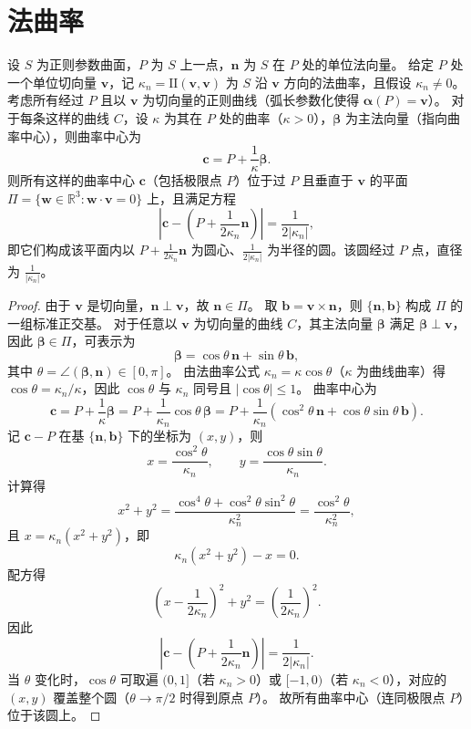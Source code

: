 \documentclass[../../main.tex]{subfiles}%
\begin{document}
\section{法曲率}

\begin{theorem}
设 $S$ 为正则参数曲面，$P$ 为 $S$ 上一点，$\boldsymbol{n}$ 为 $S$ 在 $P$ 处的单位法向量。
给定 $P$ 处一个单位切向量 $\boldsymbol{v}$，记 $\kappa_n = \mathrm{I\!I}(\boldsymbol{v},\boldsymbol{v})$ 为 $S$ 沿 $\boldsymbol{v}$ 方向的法曲率，且假设 $\kappa_n \neq 0$。
考虑所有经过 $P$ 且以 $\boldsymbol{v}$ 为切向量的正则曲线（弧长参数化使得 $\boldsymbol{\alpha}(P)=\boldsymbol{v}$）。
对于每条这样的曲线 $C$，设 $\kappa$ 为其在 $P$ 处的曲率（$\kappa>0$），$\boldsymbol{\beta}$ 为主法向量（指向曲率中心），则曲率中心为
\[
\boldsymbol{c} = P + \frac{1}{\kappa}\boldsymbol{\beta}.
\]
则所有这样的曲率中心 $\boldsymbol{c}$（包括极限点 $P$）位于过 $P$ 且垂直于 $\boldsymbol{v}$ 的平面 $\Pi = \{\boldsymbol{w}\in\mathbb{R}^3: \boldsymbol{w}\cdot\boldsymbol{v}=0\}$ 上，且满足方程
\[
\left|\boldsymbol{c} - \left(P + \frac{1}{2\kappa_n}\boldsymbol{n}\right)\right| = \frac{1}{2|\kappa_n|},
\]
即它们构成该平面内以 $P + \frac{1}{2\kappa_n}\boldsymbol{n}$ 为圆心、$\frac{1}{2|\kappa_n|}$ 为半径的圆。该圆经过 $P$ 点，直径为 $\frac{1}{|\kappa_n|}$。
\end{theorem}
\begin{proof}

由于 $\boldsymbol{v}$ 是切向量，$\boldsymbol{n}\perp\boldsymbol{v}$，故 $\boldsymbol{n}\in\Pi$。
取 $\boldsymbol{b} = \boldsymbol{v}\times\boldsymbol{n}$，则 $\{\boldsymbol{n},\boldsymbol{b}\}$ 构成 $\Pi$ 的一组标准正交基。
对于任意以 $\boldsymbol{v}$ 为切向量的曲线 $C$，其主法向量 $\boldsymbol{\beta}$ 满足 $\boldsymbol{\beta}\perp\boldsymbol{v}$，因此 $\boldsymbol{\beta}\in\Pi$，可表示为
\[
\boldsymbol{\beta} = \cos\theta\,\boldsymbol{n} + \sin\theta\,\boldsymbol{b},
\]
其中 $\theta = \angle(\boldsymbol{\beta},\boldsymbol{n})\in[0,\pi]$。
由法曲率公式 $\kappa_n = \kappa\cos\theta$（$\kappa$ 为曲线曲率）得 $\cos\theta = \kappa_n/\kappa$，因此 $\cos\theta$ 与 $\kappa_n$ 同号且 $|\cos\theta|\leqslant 1$。
曲率中心为
\[
\boldsymbol{c} = P + \frac{1}{\kappa}\boldsymbol{\beta}
= P + \frac{1}{\kappa_n}\cos\theta\,\boldsymbol{\beta}
= P + \frac{1}{\kappa_n}\left(\cos^2\theta\,\boldsymbol{n} + \cos\theta\sin\theta\,\boldsymbol{b}\right).
\]
记 $\boldsymbol{c}-P$ 在基 $\{\boldsymbol{n},\boldsymbol{b}\}$ 下的坐标为 $(x,y)$，则
\[
x = \frac{\cos^2\theta}{\kappa_n},\qquad y = \frac{\cos\theta\sin\theta}{\kappa_n}.
\]
计算得
\[
x^2+y^2 = \frac{\cos^4\theta+\cos^2\theta\sin^2\theta}{\kappa_n^2} = \frac{\cos^2\theta}{\kappa_n^2},
\]
且 $x = \kappa_n(x^2+y^2)$，即
\[
\kappa_n(x^2+y^2) - x = 0.
\]
配方得
\[
\left(x - \frac{1}{2\kappa_n}\right)^2 + y^2 = \left(\frac{1}{2\kappa_n}\right)^2.
\]
因此
\[
\left|\boldsymbol{c} - \left(P + \frac{1}{2\kappa_n}\boldsymbol{n}\right)\right| = \frac{1}{2|\kappa_n|}.
\]
当 $\theta$ 变化时，$\cos\theta$ 可取遍 $(0,1]$（若 $\kappa_n>0$）或 $[-1,0)$（若 $\kappa_n<0$），对应的 $(x,y)$ 覆盖整个圆（$\theta\to\pi/2$ 时得到原点 $P$）。
故所有曲率中心（连同极限点 $P$）位于该圆上。
\end{proof}
\end{document}
